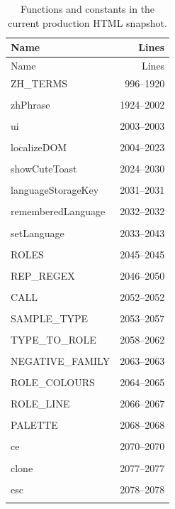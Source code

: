 {\footnotesize\begin{longtable}{@{}p{11cm}r@{}}
\caption{Functions and constants in the current production HTML snapshot.}\label{tab:fnindex}\\
\toprule Name & Lines\\\midrule\endfirsthead
\toprule Name & Lines\\\midrule\endhead
ZH\_TERMS & 996--1920 \\\\\hline
zhPhrase & 1924--2002 \\\\\hline
ui & 2003--2003 \\\\\hline
localizeDOM & 2004--2023 \\\\\hline
showCuteToast & 2024--2030 \\\\\hline
languageStorageKey & 2031--2031 \\\\\hline
rememberedLanguage & 2032--2032 \\\\\hline
setLanguage & 2033--2043 \\\\\hline
ROLES & 2045--2045 \\\\\hline
REP\_REGEX & 2046--2050 \\\\\hline
CALL & 2052--2052 \\\\\hline
SAMPLE\_TYPE & 2053--2057 \\\\\hline
TYPE\_TO\_ROLE & 2058--2062 \\\\\hline
NEGATIVE\_FAMILY & 2063--2063 \\\\\hline
ROLE\_COLOURS & 2064--2065 \\\\\hline
ROLE\_LINE & 2066--2067 \\\\\hline
PALETTE & 2068--2068 \\\\\hline
ce & 2070--2070 \\\\\hline
clone & 2077--2077 \\\\\hline
esc & 2078--2078 \\\\\hline

\end{longtable}}
